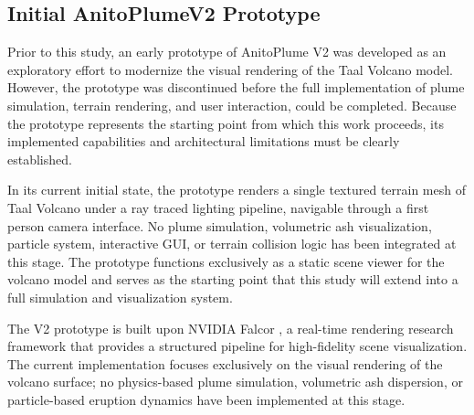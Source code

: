 \subsection{Initial AnitoPlumeV2 Prototype}

Prior to this study, an early prototype of AnitoPlume V2 was developed as an exploratory effort to modernize the visual rendering of the Taal Volcano model. However, the prototype was discontinued before the full implementation of plume simulation, terrain rendering, and user interaction, could be completed. Because the prototype represents the starting point from which this work proceeds, its implemented capabilities and architectural limitations must be clearly established.

In its current initial state, the prototype renders a single textured terrain mesh of Taal Volcano under a ray traced lighting pipeline, navigable through a first person camera interface. No plume simulation, volumetric ash visualization, particle system, interactive GUI, or terrain collision logic has been integrated at this stage. The prototype functions exclusively as a static scene viewer for the volcano model and serves as the starting point that this study will extend into a full simulation and visualization system.

The V2 prototype is built upon NVIDIA Falcor \cite{falcor2024}, a real-time rendering research framework that provides a structured pipeline for high-fidelity scene visualization. The current implementation focuses exclusively on the visual rendering of the volcano surface; no physics-based plume simulation, volumetric ash dispersion, or particle-based eruption dynamics have been implemented at this stage. 

